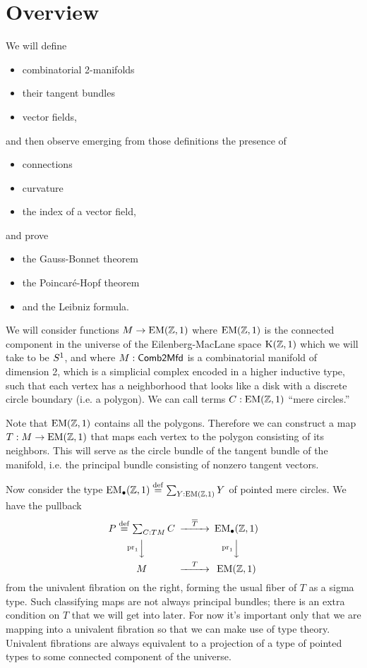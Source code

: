 \section{Overview}
We will define 
\begin{itemize}
\item combinatorial 2-manifolds
\item their tangent bundles
\item vector fields,
\end{itemize}
and then observe emerging from those definitions the presence of
\begin{itemize}
\item connections
\item curvature
\item the index of a vector field,
\end{itemize}
and prove
\begin{itemize}
\item the Gauss-Bonnet theorem
\item the Poincaré-Hopf theorem
\item and the Leibniz formula.
\end{itemize}

We will consider functions \( M\to \mathrm{EM}(\mathbb{Z},1) \) where \( \mathrm{EM}(\mathbb{Z},1) \) is the connected component in the universe of the Eilenberg-MacLane space \( \mathrm{K}(\mathbb{Z},1) \) which we will take to be \( S^1 \), and where \( M:\mathsf{Comb2Mfd} \) is a combinatorial manifold of dimension 2, which is a simplicial complex encoded in a higher inductive type, such that each vertex has a neighborhood that looks like a disk with a discrete circle boundary (i.e. a polygon). We can call terms \( C:\mathrm{EM}(\mathbb{Z},1) \) ``mere circles.''

Note that \( \mathrm{EM}(\mathbb{Z},1) \) contains all the polygons. Therefore we can construct a map \( T:M\to\mathrm{EM}(\mathbb{Z},1) \) that maps each vertex to the polygon consisting of its neighbors. This will serve as the circle bundle of the tangent bundle of the manifold, i.e. the principal bundle consisting of nonzero tangent vectors.

Now consider the type \( \mathrm{EM_{\bullet}}(\mathbb{Z},1)\stackrel{\mathrm{def}}{=} \sum_{Y:\mathrm{EM}(\mathbb{Z},1)}Y \) of pointed mere circles. We have the pullback
\[ 
\begin{CD}
P\defeq\sit{C:TM}C @>\overline{T}>> \EMp(\zz,1) \\
@V{\pr_1}VV @V{\pr_1}VV \\
M @>T>> \EM(\zz,1)
\end{CD}
\]
from the univalent fibration on the right, forming the usual fiber of \( T \) as a sigma type. Such classifying maps are not always principal bundles; there is an extra condition on \( T \) that we will get into later. For now it's important only that we are mapping into a univalent fibration so that we can make use of type theory. Univalent fibrations are always equivalent to a projection of a type of pointed types to some connected component of the universe.

